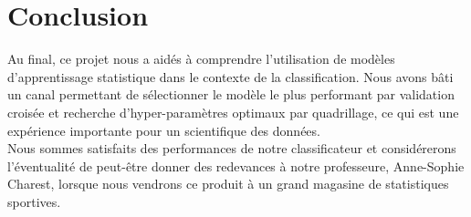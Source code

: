 \section{Conclusion}
Au final, ce projet nous a aidés à comprendre l’utilisation de modèles d’apprentissage statistique dans le contexte de la classification. Nous avons bâti un canal permettant de sélectionner le modèle le plus performant par validation croisée et recherche d’hyper-paramètres optimaux par quadrillage, ce qui est une expérience importante pour un scientifique des données.\\

Nous sommes satisfaits des performances de notre classificateur et considérerons l'éventualité de peut-être donner des redevances à notre professeure, Anne-Sophie Charest, lorsque nous vendrons ce produit à un grand magasine de statistiques sportives.